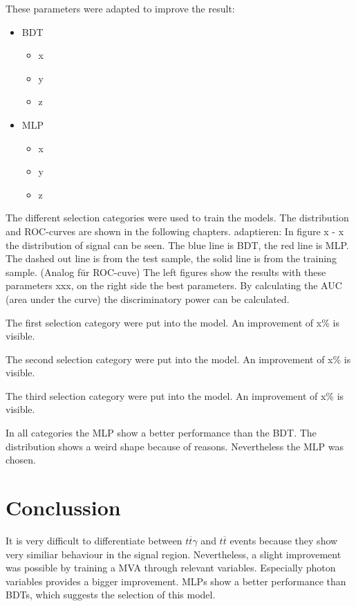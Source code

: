 \documentclass[11pt]{scrartcl}
\begin{document}
	These parameters were adapted to improve the result:
		\begin{itemize}
  			\item BDT
  					\begin{itemize}
  					\item x
  					\item y
  					\item z
  					\end{itemize}
  		  	\item MLP
  					\begin{itemize}
  					\item x
  					\item y
  					\item z
  					\end{itemize}		
		\end{itemize}
	The different selection categories were used to train the models. The distribution and ROC-curves are shown in the following chapters. adaptieren: In figure x - x the distribution of signal can be seen. The blue line is BDT, the red line is MLP. The dashed out line is from the test sample, the solid line is from the training sample. (Analog für ROC-cuve) The left figures show the results with these parameters xxx, on the right side the best parameters. By calculating the AUC (area under the curve) the discriminatory power can be calculated.
	
	The first selection category were put into the model. An improvement of x\% is visible.
	
	The second selection category were put into the model. An improvement of x\% is visible.
	
	The third selection category were put into the model. An improvement of x\% is visible.
	
	In all categories the MLP show a better performance than the BDT. The distribution shows a weird shape because of reasons. Nevertheless the MLP was chosen.
	
\section{Conclussion}
It is very difficult to differentiate between $t\overline{t}\gamma$ and $t\overline{t}$ events because they show very similiar behaviour in the signal region. Nevertheless, a slight improvement was possible by training a MVA through relevant variables. Especially photon variables provides a bigger improvement. MLPs show a better performance than BDTs, which suggests the selection of this model.
\end{document}
